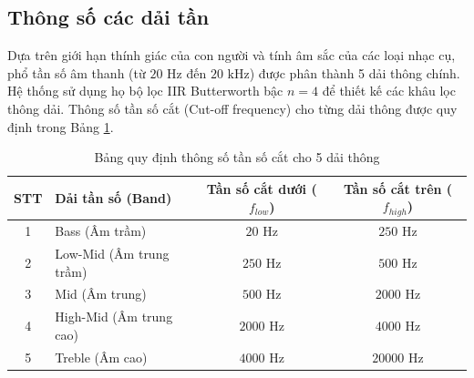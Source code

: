 \documentclass[12pt,a4paper]{article}
\begin{document}
\subsection{Thông số các dải tần}
Dựa trên giới hạn thính giác của con người và tính âm sắc của các loại nhạc cụ, phổ tần số âm thanh (từ $20 \text{ Hz}$ đến $20 \text{ kHz}$) được phân thành 5 dải thông chính. Hệ thống sử dụng họ bộ lọc IIR Butterworth bậc $n = 4$ để thiết kế các khâu lọc thông dải. Thông số tần số cắt (Cut-off frequency) cho từng dải thông được quy định trong Bảng \ref{tab:freq_bands}.
\begin{table}[H]
    \centering
    \begin{tabular}{|c|l|c|c|}
        \hline
        \textbf{STT} & \textbf{Dải tần số (Band)} & \textbf{Tần số cắt dưới ($f_{low}$)} & \textbf{Tần số cắt trên ($f_{high}$)} \\
        \hline
        1 & Bass (Âm trầm) & $20 \text{ Hz}$ & $250 \text{ Hz}$ \\
        \hline
        2 & Low-Mid (Âm trung trầm) & $250 \text{ Hz}$ & $500 \text{ Hz}$ \\
        \hline
        3 & Mid (Âm trung) & $500 \text{ Hz}$ & $2000 \text{ Hz}$ \\
        \hline
        4 & High-Mid (Âm trung cao) & $2000 \text{ Hz}$ & $4000 \text{ Hz}$ \\
        \hline
        5 & Treble (Âm cao) & $4000 \text{ Hz}$ & $20000 \text{ Hz}$ \\
        \hline
    \end{tabular}
    \caption{Bảng quy định thông số tần số cắt cho 5 dải thông}
    \label{tab:freq_bands}
\end{table}
\end{document}
